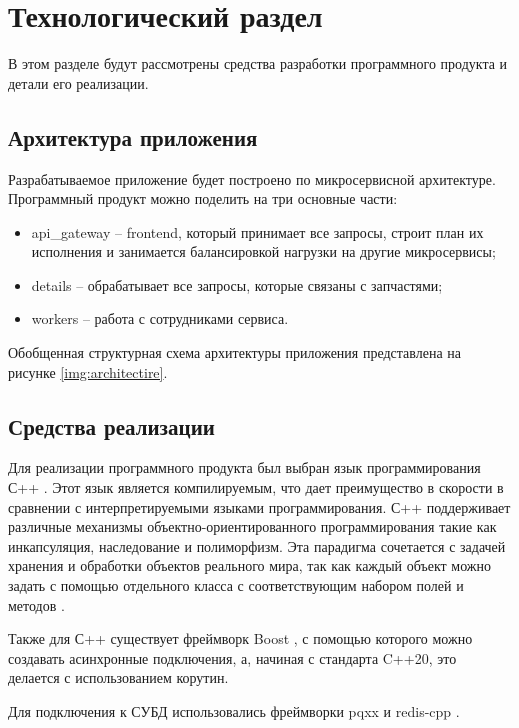 \chapter{Технологический раздел}

В этом разделе будут рассмотрены средства разработки программного продукта и детали его реализации.

\section{Архитектура приложения}

Разрабатываемое приложение будет построено по микросервисной архитектуре. Программный продукт можно поделить на три основные части:
\begin{itemize}
	\item api\_gateway -- frontend, который принимает все запросы, строит план их исполнения и занимается балансировкой нагрузки на другие микросервисы;
	\item details -- обрабатывает все запросы, которые связаны с запчастями;
	\item workers -- работа с сотрудниками сервиса.
\end{itemize}

Обобщенная структурная схема архитектуры приложения представлена на рисунке \ref{img:architectire}.


\section{Средства реализации}

Для реализации программного продукта был выбран язык программирования С++ \cite{cpp}. Этот язык является компилируемым, что дает преимущество в скорости в сравнении с интерпретируемыми языками программирования. С++ поддерживает различные механизмы объектно-ориентированного программирования такие как инкапсуляция, наследование и полиморфизм. Эта парадигма сочетается с задачей хранения и обработки объектов реального мира, так как каждый объект можно задать с помощью отдельного класса с соответствующим набором полей и методов \cite{oop}.

Также для С++ существует фреймворк Boost \cite{boost}, с помощью которого можно создавать асинхронные подключения, а, начиная с стандарта C++20, это делается с использованием корутин.

Для подключения к СУБД использовались фреймворки pqxx \cite{pqxx} и redis-cpp \cite{redis-cpp}.

